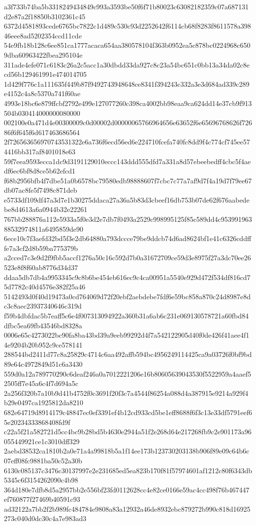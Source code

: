 {a3f733b74ba5b3318249434849c993a3593be50f6f71b80023c63082182359c07a687131d2e87a2f18850b3102361c45
6372d4581893cede6765bc7822c1d489c530c93d2252642f6114cb68f8283f8611578a39846eee8ad5202354ccd11cde
54e9fb18b128c6ee851ca1777acaca654aa380578104f363b0952ea5c878bc0224968c6509dba60963422fbea295104e
311ade4efe071c6183c26a2c5acc1a30dbdd33da927c8c23a54bc651c0bb13a34da02c8ecd56b129461991e474014705
1d429f776c1a111635f449b87f9492743948648ce8341f394243c332a3e3d684ad339c289e4152c4a8c5370a741f60ae
4993e18bc6e879ffcbf2792e499e127077260c398ca4002bb98eaa9ca624dd14e37cb9f913504b030414000000080000
002100e0a471d4e00300009c0d00002d00000065766964656e63652f6e65696768626f72686f6f645f6d617463686564
2f726563656970743531322e6a736f6ecd56ed6e224710fcefa740fc8dd9f4c774cf745ee574416bb317af8401018e63
59f7eea9593ecca1dc9d3191129010eccc143ddd555dfd7a331a8d57ebeebedff4cbc5f4aedf6ec6bf8d8ce5b62efcd1
f68b2956bfb4f7dbe51a0b6578bc79580edb98888607f7cbc7c77a7af9d7f4a19d7f79ee67db07ac8fe5f7498c871deb
e5733df109df47a3d7e1b30275ddaca27a36a5b83d3cbeef16db753b07de62f676aabedebe8d4613a6a0944b32e22261
767bb288876a112e5933a5f0e3d2e7db7f0493a2529c998995125f85c589dd4c95399196388532974811a6495859de90
6ece10c7f3aefd32bd5f3e2db64880a793dccce79be9ddcb74d6ad8624bf1e41c6326cddfffe7a3cf2d8b59ba775379b
a2cced7c3e9d2f9fbb5accf1276a50c16c592d7b0a31672709ce59d3e8975f27a3dc70ee26523e8f8f60ab8776d34d37
ddaa5db7db4a9953345c9c8b6be454eb616ec9c4ca00951a5540e929d472f534df816cd75d7782c40d4576e382f25a46
5142493d0f40d19473a0cd764069d72f20ebf2aebdebe7fdf6e59bc858a870c24d8987e8dc3c8aec23937340646c319d
f59b4dbfdac5b7eaff5c6e4f007313094922a360b31a6ab6c231e069130578721a60fbd84dfbc5ea69fb43546bd8328a
0006e65c4273022bc90fa8ba43bd39a9eeb99292d4f7a542122905d40f0de426f41aee4f14e9204b20b952c9ce578141
288544bd2411d77c8a25829c4714c6aa492affb594bc4956249114425ca9a03726f0bf9bd89e64c4972849d51c6a3430
559d0a12a789770290c6deaf246a0a7012221206e16b80605639043530f5522959a4aaef52505ff7e45a6c4f7d694a5c
2a256f320b7a10b9d41b4752f0c3691f20f3c7a4544f86254a088d4a387915e9214a929f4b29e0497ca1925812da8210
682e64719d8914179c48847ec0ef3391ef4b12cd933cd5be1eff8688f6f3c13e33df5791eef65e20234333868408fd9f
c22a5f21a582721d5cc4bc9b28bd5b4630e2944a51f2e268d64e217268fb9c2e901173a96055449921ce1c3010dff329
2aebd38532ca1810b2a0e71a4a99818b5a1f14ee173b123730203138b906f89e09c64b6c07eff08fc9881ba50c52a30b
6130c085137c3476c30137997e2e231685ed5ea823b170f81f57974601af1212c80f6343db5345c6f3154262090c4b98
364d180e7dfb8d5a2957bb2e556bf23fd0112628cc4e82ce0166e59ac4cc498f76b467447ef760877f27469b40591c93
ad32122a7bb2f2b989fc484784e9808a83a12932a46de8932ebc879272b990c818d16925273c040d0dc30c4a7e983ad3
}

